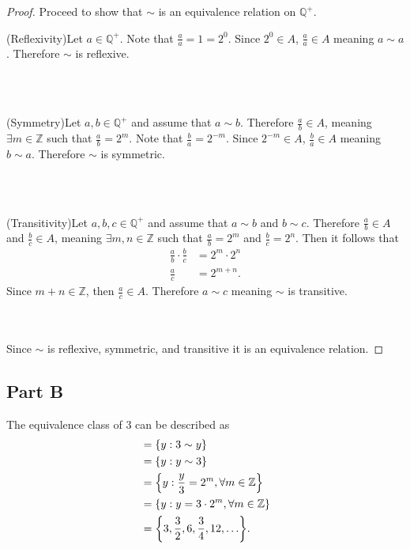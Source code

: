 \documentclass[12pt]{extarticle}
\begin{document}
\begin{proof}
	Proceed to show that $\sim$ is an equivalence relation on $\mathbb{Q}^+$. \\

	\qquad\begin{minipage}{\dimexpr\textwidth-2cm}
		(Reflexivity)\quad Let $a \in \mathbb{Q}^+$. Note that $\frac{a}{a} = 1 = 2^0$. Since $2^0 \in A$, $\frac{a}{a} \in A$ meaning $a \sim a$. Therefore $\sim$ is reflexive.
	\end{minipage} \\ \\

	\qquad\begin{minipage}{\dimexpr\textwidth-2cm}
		(Symmetry)\quad Let $a, b \in \mathbb{Q}^+$ and assume that $a \sim b$. Therefore $\frac{a}{b} \in A$, meaning $\exists m \in \mathbb{Z}$ such that $\frac{a}{b} = 2^m$. Note that $\frac{b}{a} = 2^{-m}$. Since $2^{-m} \in A$, $\frac{b}{a} \in A$ meaning $b \sim a$. Therefore $\sim$ is symmetric.
	\end{minipage} \\ \\

	\qquad\begin{minipage}{\dimexpr\textwidth-2cm}
		(Transitivity)\quad Let $a,b,c \in \mathbb{Q}^+$ and assume that $a \sim b$ and $b \sim c$. Therefore $\frac{a}{b} \in A$ and $\frac{b}{c} \in A$, meaning $\exists m,n \in \mathbb{Z}$ such that $\frac{a}{b} = 2^m$ and $\frac{b}{c} = 2^n$. Then it follows that
		\begin{align*}
			\frac{a}{b} \cdot \frac{b}{c} &= 2^m \cdot 2^n \\
			\frac{a}{c} &= 2^{m+n}
		.\end{align*}
		Since $m + n \in \mathbb{Z}$, then $\frac{a}{c} \in A$. Therefore $a \sim c$ meaning $\sim$ is transitive.
	\end{minipage} \\ \\

	Since $\sim$ is reflexive, symmetric, and transitive it is an equivalence relation.
\end{proof}

\subsection*{Part B}
The equivalence class of $3$ can be described as
\begin{align*}
	[3] &= \qty{y: 3 \sim y} \\
			&= \qty{y: y \sim 3} \\
			&= \qty{y: \frac{y}{3} = 2^m, \forall m \in \mathbb{Z}} \\
			&= \qty{y: y = 3\cdot 2^m, \forall m \in \mathbb{Z}} \\
			&= \qty{3, \frac{3}{2}, 6, \frac{3}{4}, 12, \ldots}
.\end{align*}
\end{document}
